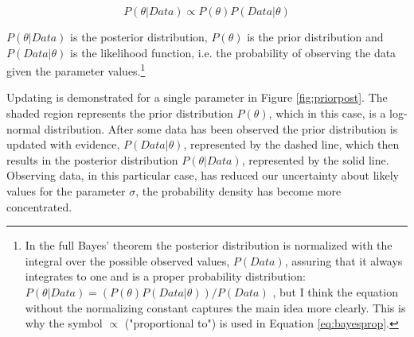\documentclass{article}\usepackage{knitr}
\begin{document}
\begin{equation}
P(\theta | Data) \propto P(\theta) P(Data | \theta)
\label{eq:bayesprop}
\end{equation} 

$P(\theta | Data)$ is the posterior distribution, $P(\theta)$ is the prior distribution and $P(Data | \theta)$ is the likelihood function, i.e. the probability of observing the data given the parameter values.\footnote{In the full Bayes' theorem the posterior distribution is normalized with the integral over the possible observed values, $P(Data)$, assuring that it always integrates to one and is a proper probability distribution: $P(\theta | Data) = (P(\theta) P(Data | \theta)) / P(Data)$ \citep{kruschke2015}, but I think the equation without the normalizing constant captures the main idea more clearly. This is why the symbol $\propto$ ("proportional to") is used in Equation \ref{eq:bayesprop}.}

Updating is demonstrated for a single parameter in Figure \ref{fig:priorpost}. The shaded region represents the prior distribution $P(\theta)$, which in this case, is a log-normal distribution.  After some data has been observed the prior distribution is updated with evidence, $P(Data | \theta)$, represented by the dashed line, which then results in the posterior distribution $P(\theta | Data)$, represented by the solid line. Observing data, in this particular case, has reduced our uncertainty about likely values for the parameter $\sigma$, the probability density has become more concentrated.
\end{document}
